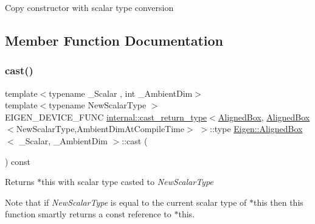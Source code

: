 Copy constructor with scalar type conversion 

\subsection{Member Function Documentation}
\mbox{\label{class_eigen_1_1_aligned_box_a269eb719d3e093d9c1cb4309b815c51b}} 
\subsubsection{\texorpdfstring{cast()}{cast()}}
{\footnotesize\ttfamily template$<$typename \+\_\+\+Scalar , int \+\_\+\+Ambient\+Dim$>$ \\
template$<$typename New\+Scalar\+Type $>$ \\
E\+I\+G\+E\+N\+\_\+\+D\+E\+V\+I\+C\+E\+\_\+\+F\+U\+NC \mbox{\hyperlink{struct_eigen_1_1internal_1_1cast__return__type}{internal\+::cast\+\_\+return\+\_\+type}}$<$\mbox{\hyperlink{class_eigen_1_1_aligned_box}{Aligned\+Box}}, \mbox{\hyperlink{class_eigen_1_1_aligned_box}{Aligned\+Box}}$<$New\+Scalar\+Type,Ambient\+Dim\+At\+Compile\+Time$>$ $>$\+::type \mbox{\hyperlink{class_eigen_1_1_aligned_box}{Eigen\+::\+Aligned\+Box}}$<$ \+\_\+\+Scalar, \+\_\+\+Ambient\+Dim $>$\+::cast (\begin{DoxyParamCaption}{ }\end{DoxyParamCaption}) const\hspace{0.3cm}{\ttfamily [inline]}}

\begin{DoxyReturn}{Returns}
{\ttfamily $\ast$this} with scalar type casted to {\itshape New\+Scalar\+Type} 
\end{DoxyReturn}
Note that if {\itshape New\+Scalar\+Type} is equal to the current scalar type of {\ttfamily $\ast$this} then this function smartly returns a const reference to {\ttfamily $\ast$this}. \mbox{\label{class_eigen_1_1_aligned_box_a7df756eb446280c7d738ac5ce73d4032}} 
